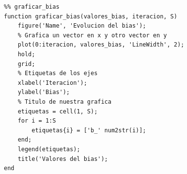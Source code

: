 \documentclass[12pt, titlepage]{article}
\begin{document}
\begin{lstlisting}
%% graficar_bias
function graficar_bias(valores_bias, iteracion, S)
    figure('Name', 'Evolucion del bias');
    % Grafica un vector en x y otro vector en y
    plot(0:iteracion, valores_bias, 'LineWidth', 2); 
    hold;
    grid;
    % Etiquetas de los ejes
    xlabel('Iteracion');
    ylabel('Bias');
    % Titulo de nuestra grafica
    etiquetas = cell(1, S);
    for i = 1:S
        etiquetas{i} = ['b_' num2str(i)];
    end;
    legend(etiquetas);
    title('Valores del bias');
end
\end{lstlisting}
\end{document}
